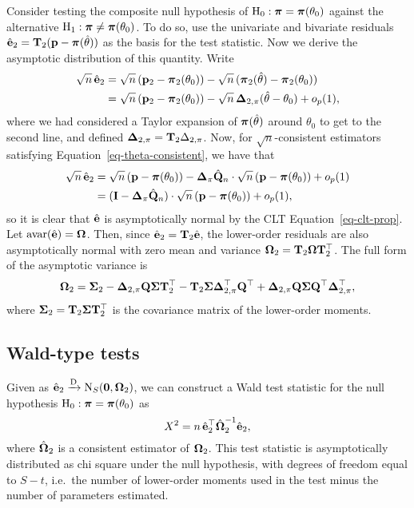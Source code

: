 \documentclass[
  letterpaper,
  DIV=11,
  numbers=noendperiod]{scrartcl}
\begin{document}
Consider testing the composite null hypothesis of
\(\text{H}_0: {\boldsymbol\pi} = {\boldsymbol\pi}(\theta_0)\) against the alternative
\(\text{H}_1:  {\boldsymbol\pi} \neq {\boldsymbol\pi}(\theta_0)\). To do so, use the univariate
and bivariate residuals \(\hat{{\mathbf e}}_2 = {\mathbf T}_2({\mathbf p} - {\boldsymbol\pi}(\hat\theta))\) as
the basis for the test statistic. Now we derive the asymptotic
distribution of this quantity. Write \[
\begin{aligned}
\sqrt n \, \hat{{\mathbf e}}_2
&= \sqrt n \, ({\mathbf p}_2 - {\boldsymbol\pi}_2(\theta_0)) - \sqrt n \, ({\boldsymbol\pi}_2(\hat\theta) - {\boldsymbol\pi}_2(\theta_0)) \\
&= \sqrt n \, ({\mathbf p}_2 - {\boldsymbol\pi}_2(\theta_0)) - \sqrt n \, {\boldsymbol\Delta}_{2,\pi} (\hat\theta - \theta_0) + o_p(1),
\end{aligned}
\] where we had considered a Taylor expansion of \({\boldsymbol\pi}(\hat\theta)\)
around \(\theta_0\) to get to the second line, and defined
\({\boldsymbol\Delta}_{2,\pi} = {\mathbf T}_2\Delta_{2,\pi}\). Now, for
\(\sqrt n\)-consistent estimators satisfying
Equation~\ref{eq-theta-consistent}, we have that \[
\begin{aligned}
\sqrt n \, \hat{{\mathbf e}}_2
&= \sqrt n \, ({\mathbf p} - {\boldsymbol\pi}(\theta_0)) -  {\boldsymbol\Delta}_{\pi} \hat{{\mathbf Q}}_n  \cdot \sqrt{n} \, ({\mathbf p} - {\boldsymbol\pi}(\theta_0)) + o_p(1) \\
&= ({\mathbf I} - {\boldsymbol\Delta}_{\pi} \hat{{\mathbf Q}}_n) \cdot \sqrt n \, ({\mathbf p} - {\boldsymbol\pi}(\theta_0)) + o_p(1),
\end{aligned}
\] so it is clear that \(\hat{{\mathbf e}}\) is asymptotically normal by the CLT
Equation~\ref{eq-clt-prop}. Let
\(\operatorname{avar}(\hat{{\mathbf e}}) = {\boldsymbol\Omega}\). Then, since
\(\hat{{\mathbf e}}_2 = {\mathbf T}_2 \hat{{\mathbf e}}\), the lower-order residuals are also
asymptotically normal with zero mean and variance
\({\boldsymbol\Omega}_2 = {\mathbf T}_2 {\boldsymbol\Omega} {\mathbf T}_2^\top\). The full form of the
asymptotic variance is \[
\begin{aligned}
{\boldsymbol\Omega}_2 = 
  {\boldsymbol\Sigma}_2 
  - {\boldsymbol\Delta}_{2,\pi} {\mathbf Q} {\boldsymbol\Sigma} {\mathbf T}_2^\top
  - {\mathbf T}_2 {\boldsymbol\Sigma} {\boldsymbol\Delta}_{2,\pi}^\top {\mathbf Q}^\top
  + {\boldsymbol\Delta}_{2,\pi} {\mathbf Q} {\boldsymbol\Sigma} {\mathbf Q}^\top {\boldsymbol\Delta}_{2,\pi}^\top,
\end{aligned}
\] where \({\boldsymbol\Sigma}_2 = {\mathbf T}_2 {\boldsymbol\Sigma} {\mathbf T}_2^\top\) is the covariance
matrix of the lower-order moments.

\subsection{Wald-type tests}\label{wald-type-tests}

Given as \(\hat{{\mathbf e}}_2 \xrightarrow{\text D} \operatorname{N}_S({\mathbf 0}, {\boldsymbol\Omega}_2)\), we
can construct a Wald test statistic for the null hypothesis
\(\text{H}_0: {\boldsymbol\pi} = {\boldsymbol\pi}(\theta_0)\) as \[
X^2 = n \, \hat{{\mathbf e}}_2^\top \hat{{\boldsymbol\Omega}}_2^{-1} \hat{{\mathbf e}}_2,
\] where \(\hat{{\boldsymbol\Omega}}_2\) is a consistent estimator of \({\boldsymbol\Omega}_2\).
This test statistic is asymptotically distributed as chi square under
the null hypothesis, with degrees of freedom equal to \(S-t\), i.e.~the
number of lower-order moments used in the test minus the number of
parameters estimated.
\end{document}
